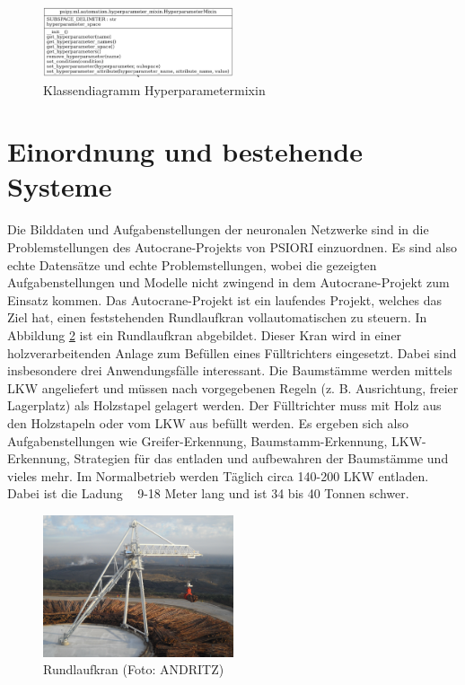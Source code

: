 	\begin{figure}[h]
		\centering
		\includegraphics[width=0.5\textwidth, center]{bilder/Klassendiagramme/Hyperparametermixin.png}
		\caption[Klassendiagramm Hyperparametermixin]{Klassendiagramm Hyperparametermixin}
		\label{img:KlassendiagrammHyperparametermixin}
	\end{figure}  
	
	\section{Einordnung und bestehende Systeme}
	\label{sec:BestehendesSystem}
	Die Bilddaten und Aufgabenstellungen der neuronalen Netzwerke sind in die Problemstellungen des Autocrane-Projekts von PSIORI einzuordnen. Es sind also echte Datensätze und echte Problemstellungen, wobei die gezeigten Aufgabenstellungen und Modelle nicht zwingend in dem Autocrane-Projekt zum Einsatz kommen. Das Autocrane-Projekt ist ein laufendes Projekt, welches das Ziel hat, einen feststehenden Rundlaufkran vollautomatischen zu steuern. In Abbildung \ref{img:CircularCrane} ist ein Rundlaufkran abgebildet. Dieser Kran wird in einer holzverarbeitenden Anlage zum Befüllen eines Fülltrichters eingesetzt. Dabei sind insbesondere drei Anwendungsfälle interessant. Die Baumstämme werden mittels LKW angeliefert und müssen nach vorgegebenen Regeln (z. B. Ausrichtung, freier Lagerplatz) als Holzstapel gelagert werden. Der Fülltrichter muss mit Holz aus den Holzstapeln oder vom LKW aus befüllt werden. Es ergeben sich also Aufgabenstellungen wie Greifer-Erkennung, Baumstamm-Erkennung, LKW-Erkennung, Strategien für das entladen und aufbewahren der Baumstämme und vieles mehr. Im Normalbetrieb werden Täglich circa 140-200 LKW entladen. Dabei ist die Ladung ~ 9-18 Meter lang und ist 34 bis 40 Tonnen schwer.  \cite{PSIORIGmbH.2020}
	\begin{figure}[h]
		\centering
		\includegraphics[width=0.5\textwidth, center]{bilder/Grundlagen/Kran_vollstaendig_N1_030.jpg}
		\caption[Rund-Kran]{Rundlaufkran (Foto: ANDRITZ)}
		\label{img:CircularCrane}
	\end{figure}		

